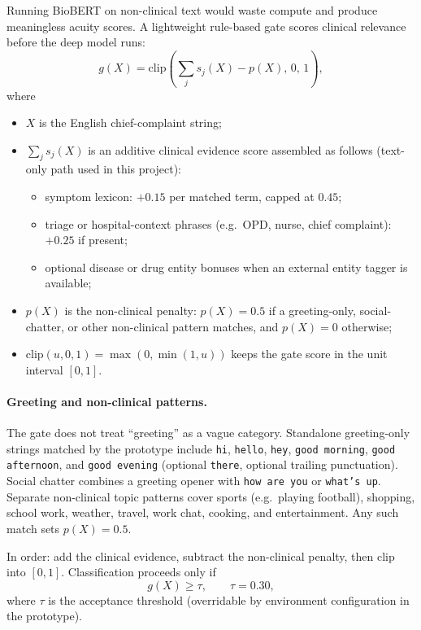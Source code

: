 Running BioBERT on non-clinical text would waste compute and produce meaningless acuity scores. A lightweight rule-based gate scores clinical relevance before the deep model runs:
\begin{equation}
  g(X) = \mathrm{clip}\!\left(\sum_{j} s_j(X) - p(X),\, 0,\, 1\right),
\end{equation}
where
\begin{itemize}
\item \(X\) is the English chief-complaint string;
\item \(\sum_j s_j(X)\) is an additive clinical evidence score assembled as follows (text-only path used in this project):
  \begin{itemize}
  \item symptom lexicon: \(+0.15\) per matched term, capped at \(0.45\);
  \item triage or hospital-context phrases (e.g.\ OPD, nurse, chief complaint): \(+0.25\) if present;
  \item optional disease or drug entity bonuses when an external entity tagger is available;
  \end{itemize}
\item \(p(X)\) is the non-clinical penalty: \(p(X)=0.5\) if a greeting-only, social-chatter, or other non-clinical pattern matches, and \(p(X)=0\) otherwise;
\item \(\mathrm{clip}(u,0,1)=\max(0,\min(1,u))\) keeps the gate score in the unit interval \([0,1]\).
\end{itemize}

\paragraph{Greeting and non-clinical patterns.}
The gate does not treat ``greeting'' as a vague category. Standalone greeting-only strings matched by the prototype include \texttt{hi}, \texttt{hello}, \texttt{hey}, \texttt{good morning}, \texttt{good afternoon}, and \texttt{good evening} (optional \texttt{there}, optional trailing punctuation). Social chatter combines a greeting opener with \texttt{how are you} or \texttt{what's up}. Separate non-clinical topic patterns cover sports (e.g.\ playing football), shopping, school work, weather, travel, work chat, cooking, and entertainment. Any such match sets \(p(X)=0.5\).

In order: add the clinical evidence, subtract the non-clinical penalty, then clip into \([0,1]\). Classification proceeds only if
\begin{equation}
  g(X) \geq \tau, \qquad \tau = 0.30,
\end{equation}
where \(\tau\) is the acceptance threshold (overridable by environment configuration in the prototype).

